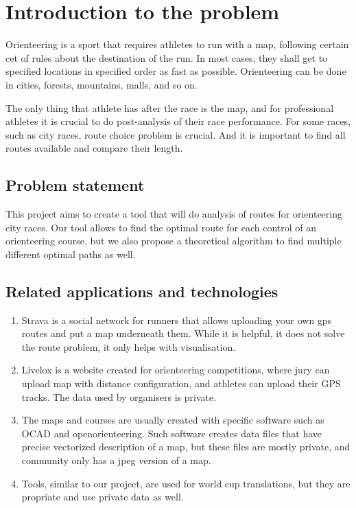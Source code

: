 \documentclass[a4paper,12pt]{extarticle}
\begin{document}
\section{Introduction to the problem}

Orienteering is a sport that requires athletes to run with a map, following certain cet of rules about the destination of the run.
In most cases, they shall get to specified locations in specified order as fast as possible.
Orienteering can be done in cities, forests, mountains, malls, and so on.

The only thing that athlete has after the race is the map, and for professional athletes it is crucial to do post-analysis of their race performance.
For some races, such as city races, route choice problem is crucial.
And it is important to find all routes available and compare their length.

\subsection{Problem statement}

This project aims to create a tool that will do analysis of routes for orienteering city races.
Our tool allows to find the optimal route for each control of an orienteering course, but we also propose a theoretical
algorithm to find multiple different optimal paths as well.

\subsection{Related applications and technologies}

\begin{enumerate}
    \item Strava is a social network for runners that allows uploading your own gps routes and put a map underneath them.
While it is helpful, it does not solve the route problem, it only helps with visualisation.
    \item Livelox is a website created for orienteering competitions, where jury can upload map with distance configuration, and athletes can upload their GPS tracks.
The data used by organisers is private. 
    \item The maps and courses are usually created with specific software such as OCAD and openorienteering. 
Such software creates data files that have precise vectorized description of a map, but these files are mostly private, and community only has a jpeg version of a map.
    \item Tools, similar to our project, are used for world cup translations, but they are propriate and use private data as well.
\end{enumerate}
\end{document}
